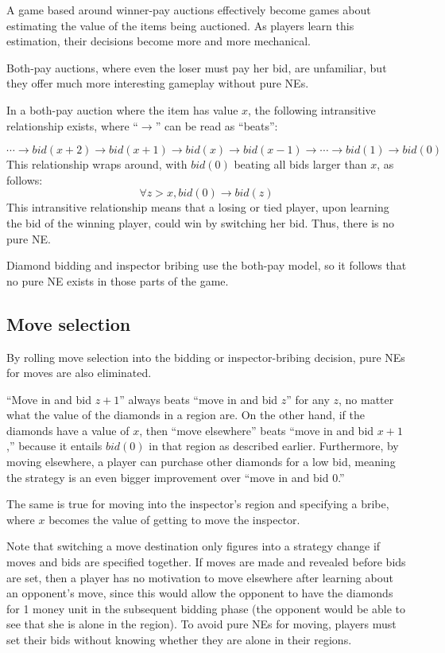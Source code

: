 A game based around winner-pay auctions effectively become games about estimating the value of the items being auctioned.  As players learn this estimation, their decisions become more and more mechanical.

Both-pay auctions, where even the loser must pay her bid, are unfamiliar, but they offer much more interesting gameplay without pure NEs.

In a both-pay auction where the item has value $x$, the following intransitive relationship exists, where ``$\longrightarrow$'' can be read as ``beats'':

\[ \cdots \longrightarrow bid(x+2) \longrightarrow bid(x+1) \longrightarrow bid(x) \longrightarrow bid(x-1) \longrightarrow \cdots \longrightarrow bid(1) \longrightarrow bid(0)
\]
This relationship wraps around, with $bid(0)$ beating all bids larger than $x$, as follows:
\[ \forall z>x, bid(0) \longrightarrow bid(z) \]
This intransitive relationship means that a losing or tied player, upon learning the bid of the winning player, could win by switching her bid.  Thus, there is no pure NE.

Diamond bidding and inspector bribing use the both-pay model, so it follows that no pure NE exists in those parts of the game.

\subsection{Move selection}
By rolling move selection into the bidding or inspector-bribing decision, pure NEs for moves are also eliminated.  

``Move in and bid $z+1$'' always beats ``move in and bid $z$'' for any $z$, no matter what the value of the diamonds in a region are. On the other hand, if the diamonds have a value of $x$, then ``move elsewhere'' beats ``move in and bid $x+1$,'' because it entails $bid(0)$ in that region as described earlier.  Furthermore, by moving elsewhere, a player can purchase other diamonds for a low bid, meaning the strategy is an even bigger improvement over ``move in and bid 0.''

The same is true for moving into the inspector's region and specifying a bribe, where $x$ becomes the value of getting to move the inspector.

Note that switching a move destination only figures into a strategy change if moves and bids are specified together.  If moves are made and revealed before bids are set, then a player has no motivation to move elsewhere after learning about an opponent's move, since this would allow the opponent to have the diamonds for 1 money unit in the subsequent bidding phase (the opponent would be able to see that she is alone in the region).  To avoid pure NEs for moving, players must set their bids without knowing whether they are alone in their regions.


